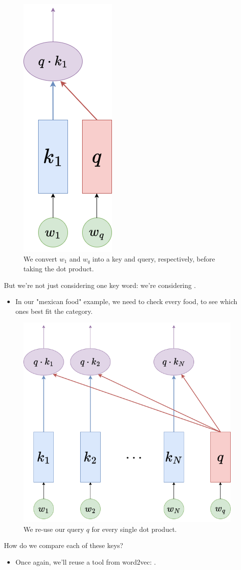         \begin{figure}[H]
            \centering
            \includegraphics[width=0.1\linewidth]{images/transformers_images/k_dot_q.png}
            \caption*{We convert $w_1$ and $w_q$ into a key and query, respectively, before taking the dot product.}
        \end{figure}

        But we're not just considering one key word: we're considering .

        \begin{itemize}
            \item In our "mexican food" example, we need to check every food, to see which ones best fit the category.
        \end{itemize}

        \begin{figure}[H]
            \centering
            \includegraphics[width=0.3\linewidth]{images/transformers_images/k_dot_q_all.png}
            \caption*{We re-use our query $q$ for every single dot product.}
        \end{figure}

        How do we compare each of these keys?

        \begin{itemize}
            \item Once again, we'll reuse a tool from word2vec: .\\
        \end{itemize}
        

